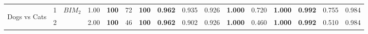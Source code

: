 \begin{table}[tph]
\begin{adjustbox}{angle=90}
{\begin{tabular}{c|c|cc|ccc|ccc|ccc|ccc}
                \\
                \midrule
                \multirow{5}{*}{\begin{turn}{90}Dogs vs Cats\end{turn}} & 1
                                                                        & \multirow{3}{*}{$BIM_{2}$}     & 1.00 &
                \textbf{100}
                                                                        & 72                             &
                \textbf{100}
                                                                        &
                \textbf{0.962}
                                                                        & 0.935
                                                                        & 0.926
                                                                        &
                \textbf{1.000}
                                                                        & 0.720
                                                                        &
                \textbf{1.000}
                                                                        &
                \textbf{0.992}
                                                                        & 0.755
                                                                        & 0.984
                \\
                                                                        & 2
                                                                        &
                                                                        & 2.00                           &
                \textbf{100}
                                                                        & 46
                                                                        &
                \textbf{100}
                                                                        &
                \textbf{0.962}
                                                                        & 0.902
                                                                        & 0.926                          &
                \textbf{1.000}
                                                                        & 0.460
                                                                        &
                \textbf{1.000}
                                                                        &
                \textbf{0.992}
                                                                        & 0.510
                                                                        & 0.984

\end{tabular}}
\end{adjustbox}
\end{table}
